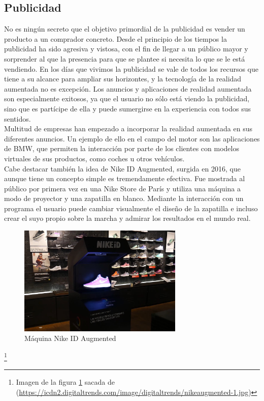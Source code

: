 \subsection{Publicidad}
No es ningún secreto que el objetivo primordial de la publicidad es vender un producto a un comprador concreto. Desde el principio de los tiempos la publicidad ha sido agresiva y vistosa, con el fin de llegar a un público mayor y sorprender al que la presencia para que se plantee si necesita lo que se le está vendiendo. En los días que vivimos la publicidad se vale de todos los recursos que tiene a su alcance para ampliar sus horizontes, y la tecnología de la realidad aumentada no es excepción. Los anuncios y aplicaciones de realidad aumentada son especialmente exitosos, ya que el usuario no sólo está viendo la publicidad, sino que es partícipe de ella y puede sumergirse en la experiencia con todos sus sentidos.\\

Multitud de empresas han empezado a incorporar la realidad aumentada en sus diferentes anuncios. Un ejemplo de ello en el campo del motor son las aplicaciones de BMW, que permiten la interacción por parte de los clientes con modelos virtuales de sus productos, como coches u otros vehículos.\cite{Neosentec_Pub}\\

Cabe destacar también la idea de Nike ID Augmented, surgida en 2016, que aunque tiene un concepto simple es tremendamente efectiva. Fue mostrada al público por primera vez en una Nike Store de París y utiliza una máquina a modo de proyector y una zapatilla en blanco. Mediante la interacción con un programa el usuario puede cambiar visualmente el diseño de la zapatilla e incluso crear el suyo propio sobre la marcha y admirar los resultados en el mundo real.

\begin{figure}[H]
     \centering
     \includegraphics[width=0.7\textwidth]{Images/nikeaugmented-1.jpg}
     \caption{Máquina Nike ID Augmented}
     \label{fig:nikeAR}
 \end{figure}
 {\let\thefootnote\relax\footnote{{Imagen de la figura \ref{fig:nikeAR} sacada de (\url{https://icdn2.digitaltrends.com/image/digitaltrends/nikeaugmented-1.jpg})}}}

